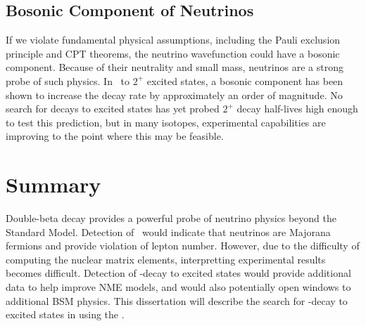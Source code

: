 \documentclass[/main.tex]{subfiles}
\begin{document}
\subsection{Bosonic Component of Neutrinos} \label{sec:bosonicnus}
If we violate fundamental physical assumptions, including the Pauli exclusion principle and CPT theorems, the neutrino wavefunction could have a bosonic component\cite{Dolgov2005}.
Because of their neutrality and small mass, neutrinos are a strong probe of such physics.
In \tnbb\ to $2^+$ excited states, a bosonic component has been shown to increase the decay rate by approximately an order of magnitude\cite{barabash2007, Tornow2010}.
No search for decays to excited states has yet probed $2^+$ decay half-lives high enough to test this prediction, but in many isotopes, experimental capabilities are improving to the point where this may be feasible.

\section{Summary}
Double-beta decay provides a powerful probe of neutrino physics beyond the Standard Model.
Detection of \znbb\ would indicate that neutrinos are Majorana fermions and provide violation of lepton number.
However, due to the difficulty of computing the nuclear matrix elements, interpretting experimental results becomes difficult.
Detection of \bb -decay to excited states would provide additional data to help improve NME models, and would also potentially open windows to additional BSM physics.
This dissertation will describe the search for \bb -decay to excited states in  using the \MJD.

\onlyinsubfile{
  
  
}
\end{document}
